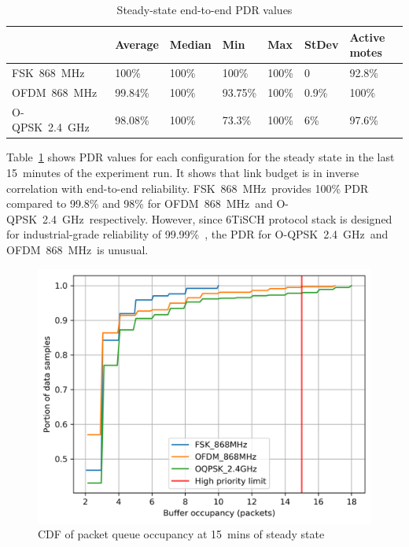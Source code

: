 \documentclass[journal]{IEEEtran}
\newcommand{\fsk}          {FSK~868~MHz}
\newcommand{\oqpsk}        {O-QPSK~2.4~GHz}
\newcommand{\ofdm}         {OFDM~868~MHz}
\begin{document}
\begin{table}[]
\centering
\begin{tabular}{|l|l|l|l|l|l|l|}
\hline
        & Average & Median & Min     & Max   & StDev & Active motes \\ \hline
\fsk\   & 100\%   & 100\%  & 100\%   & 100\% & 0     & 92.8\%     \\ \hline
\ofdm\  & 99.84\% & 100\%  & 93.75\% & 100\% & 0.9\% & 100\%      \\ \hline
\oqpsk\ & 98.08\% & 100\%  & 73.3\%  & 100\% & 6\%   & 97.6\%     \\ \hline
\end{tabular}
\caption{Steady-state end-to-end PDR values}
\label{tab:pdr_table}
\end{table}


Table~\ref{tab:pdr_table} shows PDR values for each configuration for the steady state in the last 15~minutes of the experiment run. 
It shows that link budget is in inverse correlation with end-to-end reliability.
\fsk\ provides 100\% PDR compared to 99.8\% and 98\% for \ofdm\ and \oqpsk\ respectively.
However, since 6TiSCH protocol stack is designed for industrial-grade reliability of 99.99\%~\cite{vucinic20key}, the PDR for \oqpsk\ and \ofdm\ is unusual.

\begin{figure}
	\centering
	\includegraphics[width=0.90\columnwidth]{maxBufferSize_cdf_plot_full_steady_15}
	\caption{CDF of packet queue occupancy at 15~mins of steady state}
    \label{fig:maxBufferSize_cdf_plot_full_steady_15}
\end{figure}
\end{document}
